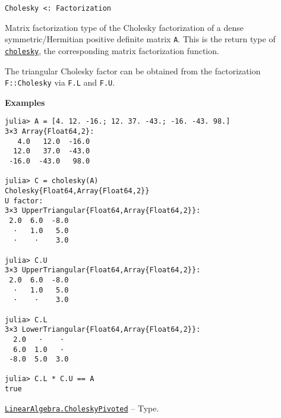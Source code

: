 \begin{adjustwidth}{2em}{0pt}


\begin{verbatim}
Cholesky <: Factorization
\end{verbatim}

Matrix factorization type of the Cholesky factorization of a dense symmetric/Hermitian positive definite matrix \texttt{A}. This is the return type of \hyperlink{7653413936706994771}{\texttt{cholesky}}, the corresponding matrix factorization function.

The triangular Cholesky factor can be obtained from the factorization \texttt{F::Cholesky} via \texttt{F.L} and \texttt{F.U}.

\textbf{Examples}


\begin{verbatim}
julia> A = [4. 12. -16.; 12. 37. -43.; -16. -43. 98.]
3×3 Array{Float64,2}:
   4.0   12.0  -16.0
  12.0   37.0  -43.0
 -16.0  -43.0   98.0

julia> C = cholesky(A)
Cholesky{Float64,Array{Float64,2}}
U factor:
3×3 UpperTriangular{Float64,Array{Float64,2}}:
 2.0  6.0  -8.0
  ⋅   1.0   5.0
  ⋅    ⋅    3.0

julia> C.U
3×3 UpperTriangular{Float64,Array{Float64,2}}:
 2.0  6.0  -8.0
  ⋅   1.0   5.0
  ⋅    ⋅    3.0

julia> C.L
3×3 LowerTriangular{Float64,Array{Float64,2}}:
  2.0   ⋅    ⋅
  6.0  1.0   ⋅
 -8.0  5.0  3.0

julia> C.L * C.U == A
true
\end{verbatim}



\end{adjustwidth}
\hypertarget{9530655262094960367}{} 
\hyperlink{9530655262094960367}{\texttt{LinearAlgebra.CholeskyPivoted}}  -- {Type.}

